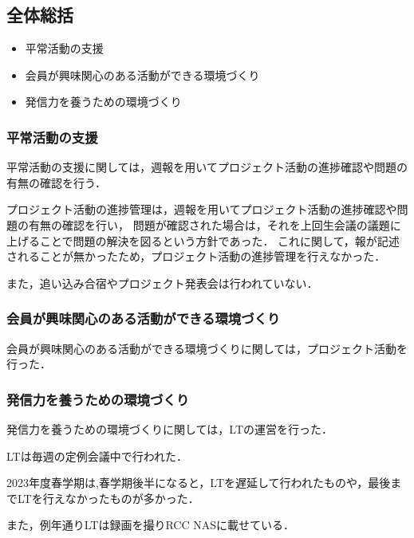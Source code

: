 \subsection*{全体総括}


\begin{itemize}
    \item 平常活動の支援
    \item 会員が興味関心のある活動ができる環境づくり
    \item 発信力を養うための環境づくり
  \end{itemize}
  
  \subsubsection*{平常活動の支援}
  平常活動の支援に関しては，週報を用いてプロジェクト活動の進捗確認や問題の有無の確認を行う．
  
  プロジェクト活動の進捗管理は，週報を用いてプロジェクト活動の進捗確認や問題の有無の確認を行い，
  問題が確認された場合は，それを上回生会議の議題に上げることで問題の解決を図るという方針であった．
  これに関して，報が記述されることが無かったため，プロジェクト活動の進捗管理を行えなかった．
  
  また，追い込み合宿やプロジェクト発表会は行われていない．
  
  \subsubsection*{会員が興味関心のある活動ができる環境づくり}
  会員が興味関心のある活動ができる環境づくりに関しては，プロジェクト活動を行った．
  
  \subsubsection*{発信力を養うための環境づくり}
  発信力を養うための環境づくりに関しては，LTの運営を行った．
  
  LTは毎週の定例会議中で行われた．
  
  2023年度春学期は,春学期後半になると，LTを遅延して行われたものや，最後までLTを行えなかったものが多かった．
  
  また，例年通りLTは録画を撮りRCC NASに載せている．
  